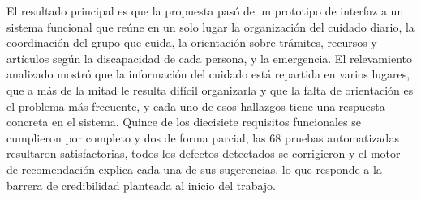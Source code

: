 El resultado principal es que la propuesta pasó de un prototipo de interfaz a un sistema funcional que reúne en un solo lugar la organización del cuidado diario, la coordinación del grupo que cuida, la orientación sobre trámites, recursos y artículos según la discapacidad de cada persona, y la emergencia. El relevamiento analizado mostró que la información del cuidado está repartida en varios lugares, que a más de la mitad le resulta difícil organizarla y que la falta de orientación es el problema más frecuente, y cada uno de esos hallazgos tiene una respuesta concreta en el sistema. Quince de los diecisiete requisitos funcionales se cumplieron por completo y dos de forma parcial, las 68 pruebas automatizadas resultaron satisfactorias, todos los defectos detectados se corrigieron y el motor de recomendación explica cada una de sus sugerencias, lo que responde a la barrera de credibilidad planteada al inicio del trabajo.

